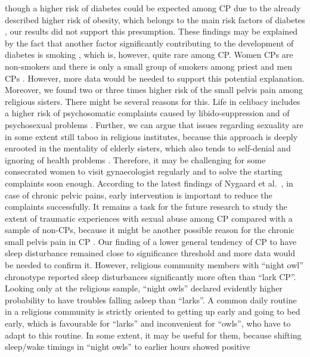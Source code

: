 \documentclass[ijerph,article,accept,moreauthors,pdftex]{mdpi}
\begin{document}
though a higher risk of diabetes could be expected among CP due to the
already described higher risk of obesity, which belongs to the main risk
factors of diabetes \citep{brovz2020prevalence}, our results did not
support this presumption. These findings may be explained by the fact
that another factor significantly contributing to the development of
diabetes is smoking \citep{brovz2020prevalence}, which is, however,
quite rare among CP. Women CPs are non-smokers \citep{butler1996trends}
and there is only a small group of smokers among priest and men CPs
\citep{stang2012cancer}. However, more data would be needed to support
this potential explanation. Moreover, we found two or three times higher
risk of the small pelvis pain among religious sisters. There might be
several reasons for this. Life in celibacy includes a higher risk of
psychosomatic complaints caused by libido-suppression and of
psychosexual problems \citep{baumann2019spiritual}. Further, we can
argue that issues regarding sexuality are in some extent still taboo in
religious institutes, because this approach is deeply enrooted in the
mentality of elderly sisters, which also tends to self-denial and
ignoring of health problems \citep{jakvsivcova2021sluzebnici}.
Therefore, it may be challenging for some consecrated women to visit
gynaecologist regularly and to solve the starting complaints soon
enough. According to the latest findings of Nygaard et
al.~\citep{nygaard2020baseline}, in case of chronic pelvic pains, early
intervention is important to reduce the complaints successfully. It
remains a task for the future research to study the extent of traumatic
experiences with sexual abuse among CP compared with a sample of
non-CPs, because it might be another possible reason for the chronic
small pelvis pain in CP \citep{heim1998abuse}. Our finding of a lower
general tendency of CP to have sleep disturbance remained close to
significance threshold and more data would be needed to confirm it.
However, religious community members with ``night owl'' chronotype
reported sleep disturbances significantly more often than ``lark CP''.
Looking only at the religious sample, ``night owls'' declared evidently
higher probability to have troubles falling asleep than ``larks''. A
common daily routine in a religious community is strictly oriented to
getting up early and going to bed early, which is favourable for
``larks'' and inconvenient for ``owls'', who have to adapt to this
routine. In some extent, it may be useful for them, because shifting
sleep/wake timings in ``night owls'' to earlier hours showed positive
\end{document}

